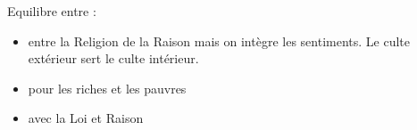 Equilibre entre : 
\begin{itemize}
    \item entre la Religion de la Raison mais on intègre les sentiments. Le culte extérieur sert le culte intérieur. 
    \item pour les riches et les pauvres
    \item avec la Loi et Raison
\end{itemize}

